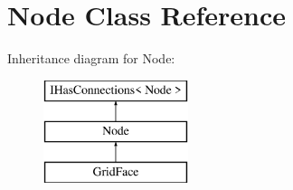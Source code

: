\hypertarget{class_node}{}\section{Node Class Reference}
\label{class_node}
Inheritance diagram for Node\+:\begin{figure}[H]
\begin{center}
\leavevmode
\includegraphics[height=3.000000cm]{class_node}
\end{center}
\end{figure}
